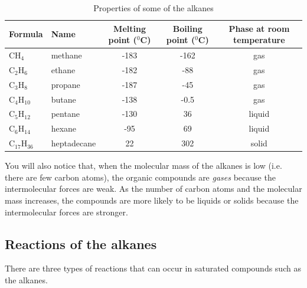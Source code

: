 \begin{table}[h]
\begin{center}
\begin{tabular}{|l|l|c|c|c|}\hline
\textbf{Formula} & \textbf{Name} & \textbf{Melting point ($^{0}$C)} & \textbf{Boiling point ($^{0}$C)} & \textbf{Phase at room temperature}\\\hline
CH$_{4}$ & methane & -183 & -162 & gas\\\hline
C$_{2}$H$_{6}$ & ethane & -182 & -88  & gas\\\hline
C$_{3}$H$_{8}$ & propane & -187 & -45 & gas \\\hline
C$_{4}$H$_{10}$ & butane & -138 & -0.5 & gas \\\hline
C$_{5}$H$_{12}$ & pentane & -130 & 36 & liquid \\\hline
C$_{6}$H$_{14}$ & hexane & -95 & 69 & liquid \\\hline
C$_{17}$H$_{36}$ & heptadecane & 22 & 302 & solid \\\hline
\end{tabular}
\caption{Properties of some of the alkanes}
\label{fig:alkane properties}
\end{center}
\end{table}

You will also notice that, when the molecular mass of the alkanes is low (i.e. there are few carbon atoms), the organic compounds are \textit{gases} because the intermolecular forces are weak. As the number of carbon atoms and the molecular mass increases, the compounds are more likely to be liquids or solids because the intermolecular forces are stronger.

\subsection{Reactions of the alkanes}

There are three types of reactions that can occur in saturated compounds such as the alkanes.

